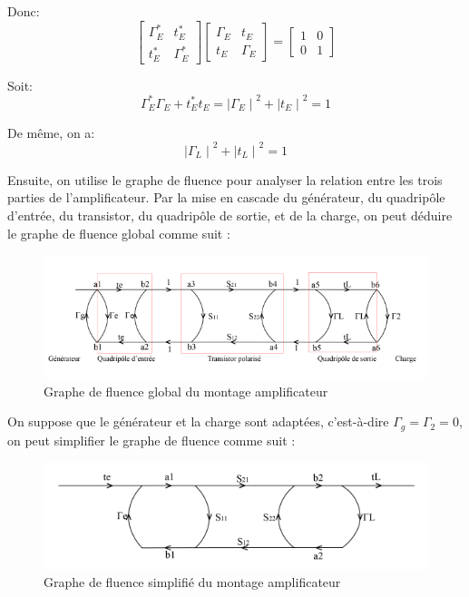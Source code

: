 \documentclass[french]{article}
\begin{document}
Donc:
\begin{equation}
	\begin{bmatrix}
		\Gamma_{E}^\ast & t_{E}^\ast\\
		t_{E}^\ast & \Gamma_{E}^\ast
	\end{bmatrix}
	\begin{bmatrix}
		\Gamma_{E} & t_{E}\\
		t_{E} & \Gamma_{E}
	\end{bmatrix}=
	\begin{bmatrix}
		1 & 0\\
		0 & 1
	\end{bmatrix}
\end{equation}

Soit:
\begin{equation}
	\Gamma_{E}^{\ast}\Gamma_{E}+t_{E}^{\ast}t_{E}
	={\mid \Gamma_{E}\mid}^2+{\mid t_{E}\mid}^2
	=1
	\label{eq2}
\end{equation}

De même, on a:
\begin{equation}
	{\mid \Gamma_{L}\mid}^2+{\mid t_{L}\mid}^2
	=1
	\label{eq3}
\end{equation}

Ensuite, on utilise le graphe de fluence pour analyser la relation entre les trois parties de l'amplificateur. Par la mise en cascade du générateur, du quadripôle d’entrée, du transistor, du quadripôle de sortie, et de la charge, on peut déduire le graphe de fluence global comme suit :

\begin{figure}[H]
	\centering
	\includegraphics[width=0.9\linewidth]{../5SynthAmp/flux_global}
	\caption{Graphe de fluence global du montage amplificateur}
	\label{fig:flux_global}
\end{figure}

On suppose que le générateur et la charge sont adaptées, c’est-à-dire $\Gamma_{g}=\Gamma_{2}=0$, on peut simplifier le graphe de fluence comme suit :

\begin{figure}[H]
	\centering
	\includegraphics[width=0.9\linewidth]{../5SynthAmp/flux_simple}
	\caption{Graphe de fluence simplifié du montage amplificateur}
	\label{fig:flux_simple}
\end{figure}
\end{document}
